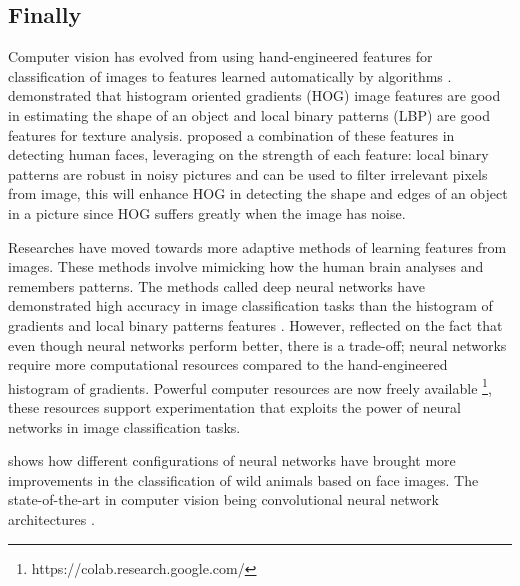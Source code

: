 \subsection{Finally}
Computer vision has evolved from using hand-engineered features for classification of images to features learned automatically by algorithms \cite{weinstein2018computer}. \citeauthor{wang2009hog} \citeyear{wang2009hog} \cite{wang2009hog} demonstrated that histogram oriented gradients (HOG) image features are good in estimating the shape of an object and local binary patterns (LBP) are good features for texture analysis. \citeauthor{wang2009hog} \citeyear{wang2009hog} \cite{wang2009hog} proposed a combination of these features in detecting human faces, leveraging on the strength of each feature: local binary patterns are robust in noisy pictures and can be used to filter irrelevant pixels from image, this will enhance HOG in detecting the shape and edges of an object in a picture since HOG suffers greatly when the image has noise. 

Researches have moved towards more adaptive methods of learning features from images. These methods involve mimicking how the human brain analyses and remembers patterns. The methods called deep neural networks have demonstrated high accuracy in image classification tasks than the histogram of gradients and local binary patterns features \cite{suleiman2017towards}. However, \citeauthor{suleiman2017towards} \citeyear{suleiman2017towards} \cite{suleiman2017towards} reflected on the fact that even though neural networks perform better, there is a trade-off; neural networks require more computational resources compared to the hand-engineered histogram of gradients. Powerful computer resources are now freely available \footnote{https://colab.research.google.com/}, these resources support experimentation that exploits the power of neural networks in image classification tasks.

\citeauthor{weinstein2018computer} \citeyear{weinstein2018computer} \cite{weinstein2018computer} shows how different configurations of neural networks have brought more improvements in the classification of wild animals based on face images. The state-of-the-art in computer vision being convolutional neural network architectures \cite{verma2018wild}.

